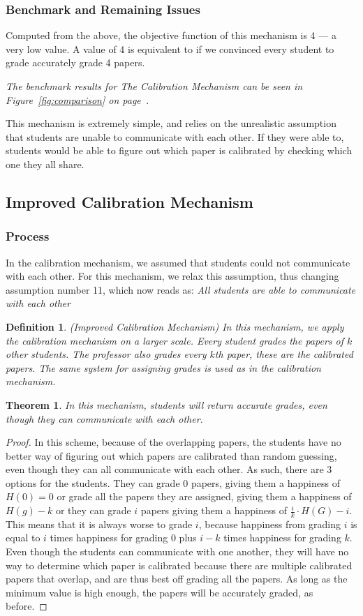\documentclass[12pt, Arial]{article}
\newtheorem{theorem}{Theorem}
\newtheorem{definition}{Definition}
\begin{document}
\subsubsection{Benchmark and Remaining Issues}
Computed from the above, the objective function of this mechanism is 4 --- a very low value. A value of 4 is equivalent to if we convinced every student to grade accurately grade 4 papers.

\emph{The benchmark results for The Calibration Mechanism can be seen in Figure~\ref{fig:comparison} on page~\pageref{fig:comparison}.}

This mechanism is extremely simple, and relies on the unrealistic assumption that students are unable to communicate with each other. If they were able to, students would be able to figure out which paper is calibrated by checking which one they all share.

\subsection{Improved Calibration Mechanism}
\subsubsection{Process}
In the calibration mechanism, we assumed that students could not communicate with each other. For this mechanism, we relax this assumption, thus changing assumption number 11, which now reads as: \emph{All students are able to communicate with each other}
\begin{definition}(Improved Calibration Mechanism)
In this mechanism, we apply the calibration mechanism on a larger scale. Every student grades the papers of $k$ other students. The professor also grades every $k$th paper, these are the calibrated papers. The same system for assigning grades is used as in the calibration mechanism.
\end{definition}
\begin{theorem}
In this mechanism, students will return accurate grades, even though they can communicate with each other.
\end{theorem}
\begin{proof}
In this scheme, because of the overlapping papers, the students have no better way of figuring out which papers are calibrated than random guessing, even though they can all communicate with each other. As such, there are 3 options for the students. They can grade 0 papers, giving them a happiness of $H(0) = 0$ or grade all the papers they are assigned, giving them a happiness of $H(g) - k$ or they can grade $i$ papers giving them a happiness of $\frac{i}{k} \cdot H(G)-i$. This means that it is always worse to grade $i$, because happiness from grading $i$ is equal to $i$ times happiness for grading 0 plus $i-k$ times happiness for grading $k$.
Even though the students can communicate with one another, they will have no way to determine which paper is calibrated because there are multiple calibrated papers that overlap, and are thus best off grading all the papers. As long as the minimum value is high enough, the papers will be accurately graded, as before.
\end{proof}
\end{document}
